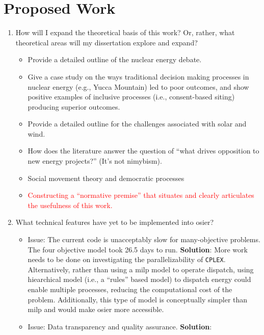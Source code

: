 \chapter{Proposed Work}


\begin{enumerate}
    \item How will I expand the theoretical basis of this work? Or, rather, what
    theoretical areas will my dissertation explore and expand?
    \begin{itemize}
        \item Provide a detailed outline of the nuclear energy debate.
        \item Give a case study on the ways traditional decision making
        processes in nuclear energy (e.g., Yucca Mountain) led to poor outcomes,
        and show positive examples of inclusive processes (i.e., consent-based
        siting) producing superior outcomes.
        \item Provide a detailed outline for the challenges associated with
        solar and wind.
        \item How does the literature answer the question of ``what drives
        opposition to new energy projects?'' (It's not \ac{nimybism}).
        \item Social movement theory and democratic processes
        \item \textcolor{red}{Constructing a ``normative premise'' that situates
        and clearly articulates the usefulness of this work.}
    \end{itemize}
    \item What technical features have yet to be implemented into \ac{osier}?
    \begin{itemize}
        \item Issue: The current code is unacceptably slow for many-objective
        problems. The four objective model took 26.5 days to run.
        \textbf{Solution}: More work needs to be done on investigating the
        parallelizability of \texttt{CPLEX}. Alternatively, rather than using a
        \ac{milp} model to operate dispatch, using hiearchical model (i.e., a
        ``rules'' based model) to dispatch energy could enable multiple
        processes, reducing the computational cost of the problem. Additionally,
        this type of model is conceptually simpler than \ac{milp} and would make
        \ac{osier} more accessible.
        \item Issue: Data transparency and quality assurance. \textbf{Solution}:

\end{itemize}
\end{enumerate}
